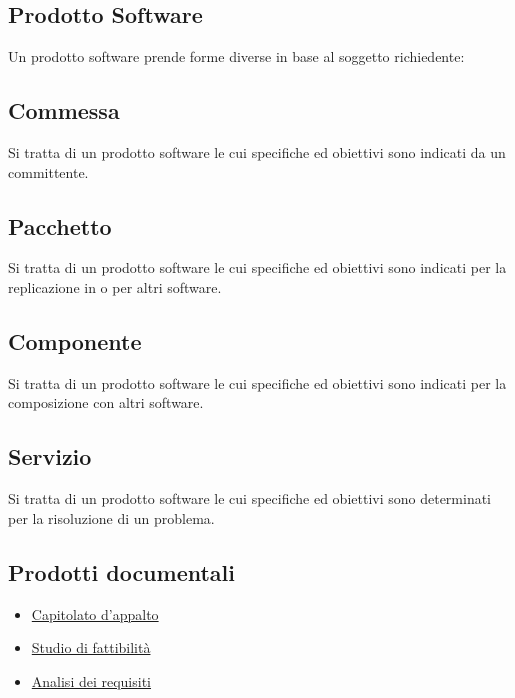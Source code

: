 	\subsection{Prodotto Software}
	\label{sec:prodottosoftware}
	Un prodotto software prende forme diverse in base al soggetto richiedente:
		
		\subsection{Commessa}
		Si tratta di un prodotto software le cui specifiche ed obiettivi sono indicati da un committente.
	
		\subsection{Pacchetto}
		Si tratta di un prodotto software le cui specifiche ed obiettivi sono indicati per la replicazione in o per altri software.
		
		\subsection{Componente}
		Si tratta di un prodotto software le cui specifiche ed obiettivi sono indicati per la composizione con altri software.
		
		\subsection{Servizio}
		Si tratta di un prodotto software le cui specifiche ed obiettivi sono determinati per la risoluzione di un problema.
	
	\subsection{Prodotti documentali}	
	\label{sec:prodottidocumentali}
	\begin{itemize}  
	\item \hyperref[sec:capitolato]{Capitolato d'appalto}
	\item \hyperref[sec:studiofattibilita]{Studio di fattibilità}
	\item \hyperref[sec:analisirequisiti]{Analisi dei requisiti} 
	\end{itemize}	
		
